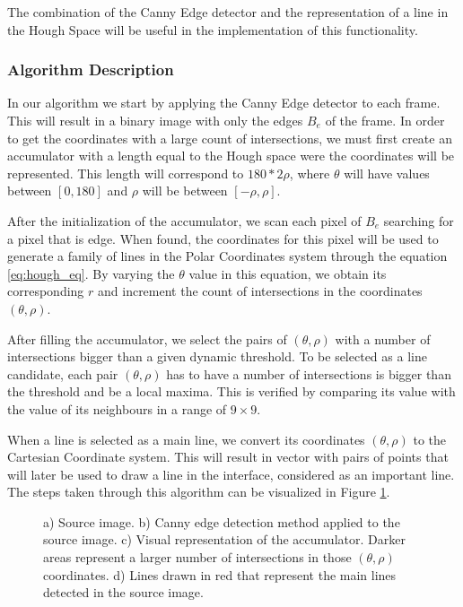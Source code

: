 The combination of the Canny Edge detector and the representation of a line in the Hough Space will be useful in the implementation of this functionality.

\subsubsection{Algorithm Description}

In our algorithm we start by applying the Canny Edge detector to each frame. This will result in a binary image with only the edges $B_{e}$ of the frame. In order to get the coordinates with a large count of intersections, we must first create an accumulator with a length equal to the Hough space were the coordinates will be represented. This length will correspond to $180 * 2\rho$, where $\theta$ will have values between $[0,180]$ and $\rho$ will be between $[-\rho,\rho]$.

After the initialization of the accumulator, we scan each pixel of $B_{e}$ searching for a pixel that is edge. When found, the coordinates for this pixel will be used to generate a family of lines in the Polar Coordinates system through the equation \ref{eq:hough_eq}. By varying the $\theta$ value in this equation, we obtain its corresponding $r$ and increment the count of intersections in the coordinates $(\theta,\rho)$.

After filling the accumulator, we select the pairs of $(\theta,\rho)$ with a number of intersections bigger than a given dynamic threshold. To be selected as a line candidate, each pair $(\theta,\rho)$ has to have a number of intersections is bigger than the threshold and be a local maxima. This is verified by comparing its value with the value of its neighbours in a range of $9 \times 9$.

When a line is selected as a main line, we convert its coordinates $(\theta,\rho)$ to the Cartesian Coordinate system. This will result in vector with pairs of points that will later be used to draw a line in the interface, considered as an important line. The steps taken through this algorithm can be visualized in Figure \ref{fig:hough_pipeline}.

\begin{figure}[htb]
	\centering
	\begin{minipage}[b][9cm]{0.5\textwidth}
  		\centering
  		\vfill
  		\vfill
  		\renewcommand{\thesubfigure}{(d)}
  	\end{minipage}
  	\renewcommand{\thesubfigure}{(c)}
	\caption{a) Source image. b) Canny edge detection method applied to the source image. c) Visual representation of the accumulator. Darker areas represent a larger number of intersections in those $(\theta,\rho)$ coordinates. d) Lines drawn in red that represent the main lines detected in the source image.}
    \label{fig:hough_pipeline}
\end{figure}

